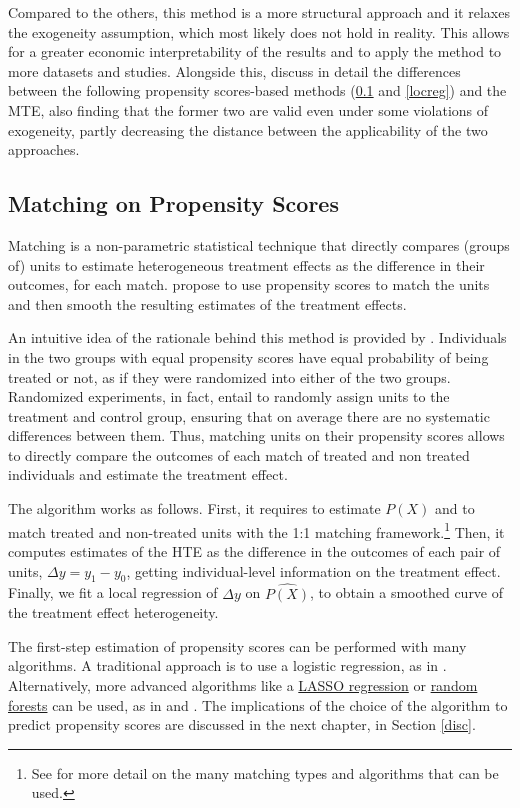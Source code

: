 \documentclass[12pt,a4paper,openright,twoside]{book}
\newcommand{\customref}[2]{\hyperref[#1]{#2}}
\begin{document}
\begin{doublespacing}
Compared to the others, this method is a more structural approach and it relaxes the exogeneity assumption, which most likely does not hold in reality. This allows for a greater economic interpretability of the results and to apply the method to more datasets and studies. Alongside this, \citet{zhou2016propensity} discuss in detail the differences between the following propensity scores-based methods (\ref{match} and \ref{locreg}) and the MTE, also finding that the former two are valid even under some violations of exogeneity, partly decreasing the distance between the applicability of the two approaches.

\subsection{Matching on Propensity Scores} \label{match}

Matching is a non-parametric statistical technique that directly compares (groups of) units to estimate heterogeneous treatment effects as the difference in their outcomes, for each match. \citet{xie2012estimating} propose to use propensity scores to match the units and then smooth the resulting estimates of the treatment effects. 

An intuitive idea of the rationale behind this method is provided by \citet{d1998propensity}. Individuals in the two groups with equal propensity scores have equal probability of being treated or not, as if they were randomized into either of the two groups. Randomized experiments, in fact, entail to randomly assign units to the treatment and control group, ensuring that on average there are no systematic differences between them. Thus, matching units on their propensity scores allows to directly compare the outcomes of each match of treated and non treated individuals and estimate the treatment effect.  

The algorithm works as follows. First, it requires to estimate $P(X)$ and to match treated and non-treated units with the 1:1 matching framework.\footnote{See \citet{xie2012estimating} for more detail on the many matching types and algorithms that can be used.} Then, it computes estimates of the HTE as the difference in the outcomes of each pair of units, $\Delta y = y_1 - y_0$, getting individual-level information on the treatment effect. Finally, we fit a local regression of $\Delta y$ on $\hat{P(X)}$, to obtain a smoothed curve of the treatment effect heterogeneity. 

The first-step estimation of propensity scores can be performed with many algorithms. A traditional approach is to use a logistic regression, as in \citet{xie2012estimating}. Alternatively, more advanced algorithms like a \customref{lasso}{LASSO regression} or \customref{rf}{random forests} can be used, as in \citet{goller2020does} and \citet{Knaus_2020}. The implications of the choice of the algorithm to predict propensity scores are discussed in the next chapter, in Section \ref{disc}. 





\end{doublespacing}
\end{document}
